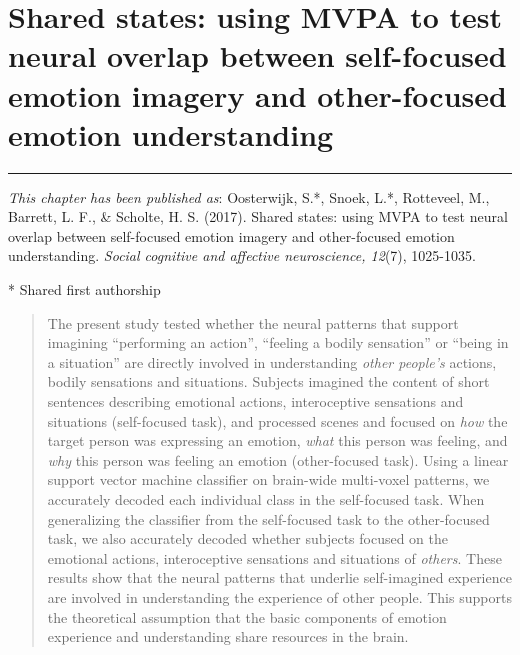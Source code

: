 \documentclass[11pt,american,a4paper,oneside,]{memoir} %
\begin{document}
\hypertarget{shared-states}{%
\chapter{Shared states: using MVPA to test neural overlap between self-focused emotion imagery and other-focused emotion understanding}\label{shared-states}}


\vspace*{\fill}

\begin{center}\rule{0.5\linewidth}{0.5pt}\end{center}

\small

\noindent
\emph{This chapter has been published as}: Oosterwijk, S.*, Snoek, L.*, Rotteveel, M., Barrett, L. F., \& Scholte, H. S. (2017). Shared states: using MVPA to test neural overlap between self-focused emotion imagery and other-focused emotion understanding. \emph{Social cognitive and affective neuroscience, 12}(7), 1025-1035.

* Shared first authorship
\newpage
\normalsize

\begin{abstract}
The present study tested whether the neural patterns that support imagining ``performing an action'', ``feeling a bodily sensation'' or ``being in a situation'' are directly involved in understanding \emph{other people's} actions, bodily sensations and situations. Subjects imagined the content of short sentences describing emotional actions, interoceptive sensations and situations (self-focused task), and processed scenes and focused on \emph{how} the target person was expressing an emotion, \emph{what} this person was feeling, and \emph{why} this person was feeling an emotion (other-focused task). Using a linear support vector machine classifier on brain-wide multi-voxel patterns, we accurately decoded each individual class in the self-focused task. When generalizing the classifier from the self-focused task to the other-focused task, we also accurately decoded whether subjects focused on the emotional actions, interoceptive sensations and situations of \emph{others}. These results show that the neural patterns that underlie self-imagined experience are involved in understanding the experience of other people. This supports the theoretical assumption that the basic components of emotion experience and understanding share resources in the brain.
\end{abstract} \newpage
\end{document}
